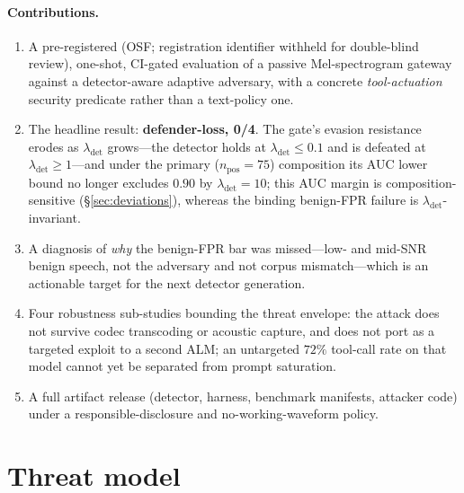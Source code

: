\documentclass[letterpaper,twocolumn,10pt]{article}
\newcommand{\osfparen}{(OSF; registration identifier withheld for double-blind review)}
\newcommand{\osfparen}{(OSF \texttt{j5x2e})}
\newcommand{\lam}{\lambda_{\mathrm{det}}}
\begin{document}
\paragraph{Contributions.}
\begin{enumerate}[leftmargin=*,itemsep=1pt,topsep=2pt]
\item A pre-registered \osfparen{}, one-shot, CI-gated evaluation of a
passive Mel-spectrogram gateway against a detector-aware adaptive adversary, with
a concrete \emph{tool-actuation} security predicate rather than a text-policy one.
\item The headline result: \textbf{defender-loss, 0/4}. The gate's evasion
resistance erodes as $\lam$ grows---the detector holds at $\lam \leq 0.1$ and is
defeated at $\lam \geq 1$---and under the primary ($n_{\mathrm{pos}}{=}75$)
composition its AUC lower bound no longer excludes $0.90$ by $\lam=10$; this AUC
margin is composition-sensitive (\S\ref{sec:deviations}), whereas the binding
benign-FPR failure is $\lam$-invariant.
\item A diagnosis of \emph{why} the benign-FPR bar was missed---low- and mid-SNR
benign speech, not the adversary and not corpus mismatch---which is an actionable
target for the next detector generation.
\item Four robustness sub-studies bounding the threat envelope: the attack does
not survive codec transcoding or acoustic capture, and does not port as a
targeted exploit to a second ALM; an untargeted $72\%$ tool-call rate on that
model cannot yet be separated from prompt saturation.
\item A full artifact release (detector, harness, benchmark manifests,
attacker code) under a responsible-disclosure and no-working-waveform policy.
\end{enumerate}

\section{Threat model}
\label{sec:threat}
\end{document}
